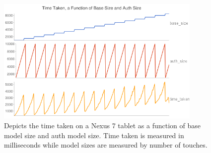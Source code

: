 \documentclass{acm_proc_article-sp}
\begin{document}

%

\begin{figure}
\centering
\includegraphics[width=3.9in]{nexus_speed_test.png}
\caption{Depicts the time taken on a Nexus 7 tablet as a function of base model size and auth model size. Time taken is measured in milliseconds while model sizes are measured by number of touches.}
\label{fig:nexus_speed_test}
\end{figure}
\end{document}
